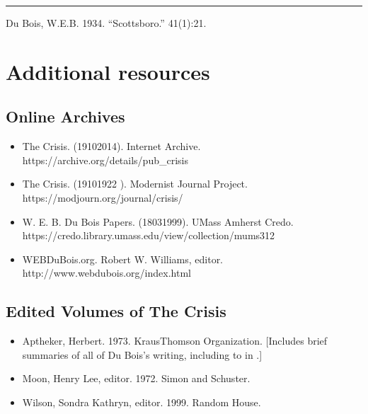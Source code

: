 \documentclass[letterpaper,10pt,english]{jupyterBook}
\begin{document}
\bigskip\hrule\bigskip


\sphinxAtStartPar
{} Du Bois, W.E.B. 1934. “Scottsboro.”  41(1):21.


\chapter{Additional resources}
\label{\detokenize{additional_resources:additional-resources}}\label{\detokenize{additional_resources::doc}}

\section{Online Archives}
\label{\detokenize{additional_resources:online-archives}}\begin{itemize}
\item {} 
\sphinxAtStartPar
The Crisis. (1910\sphinxhyphen{}2014). Internet Archive. https://archive.org/details/pub\_crisis

\item {} 
\sphinxAtStartPar
The Crisis. (1910\sphinxhyphen{}1922  ). Modernist Journal Project. https://modjourn.org/journal/crisis/

\item {} 
\sphinxAtStartPar
W. E. B. Du Bois Papers. (1803\sphinxhyphen{}1999). UMass Amherst Credo. https://credo.library.umass.edu/view/collection/mums312

\item {} 
\sphinxAtStartPar
WEBDuBois.org. Robert W. Williams, editor. http://www.webdubois.org/index.html

\end{itemize}


\section{Edited Volumes of The Crisis}
\label{\detokenize{additional_resources:edited-volumes-of-the-crisis}}\begin{itemize}
\item {} 
\sphinxAtStartPar
Aptheker, Herbert. 1973.  Kraus\sphinxhyphen{}Thomson Organization. {[}Includes brief summaries of all of Du Bois’s writing, including to in .{]}

\item {} 
\sphinxAtStartPar
Moon, Henry Lee, editor. 1972.  Simon and Schuster.

\item {} 
\sphinxAtStartPar
Wilson, Sondra Kathryn, editor. 1999.  Random House.

\end{itemize}
\end{document}
